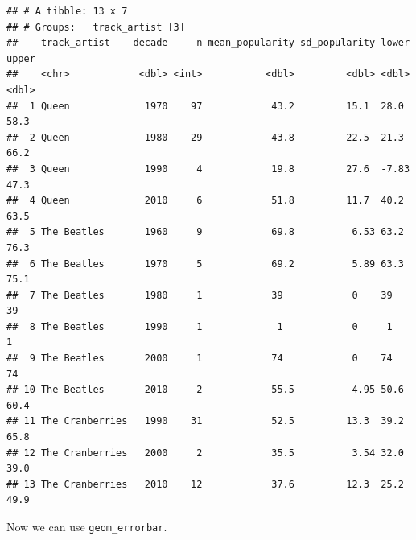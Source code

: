 \documentclass[
]{book}
\newenvironment{Shaded}{\begin{snugshade}}{\end{snugshade}}
\newcommand{\DataTypeTok}[1]{\textcolor[rgb]{0.13,0.29,0.53}{#1}}
\newcommand{\DecValTok}[1]{\textcolor[rgb]{0.00,0.00,0.81}{#1}}
\newcommand{\KeywordTok}[1]{\textcolor[rgb]{0.13,0.29,0.53}{\textbf{#1}}}
\newcommand{\NormalTok}[1]{#1}
\newcommand{\OperatorTok}[1]{\textcolor[rgb]{0.81,0.36,0.00}{\textbf{#1}}}
\newcommand{\StringTok}[1]{\textcolor[rgb]{0.31,0.60,0.02}{#1}}
\begin{document}
\begin{verbatim}
## # A tibble: 13 x 7
## # Groups:   track_artist [3]
##    track_artist    decade     n mean_popularity sd_popularity lower upper
##    <chr>            <dbl> <int>           <dbl>         <dbl> <dbl> <dbl>
##  1 Queen             1970    97            43.2         15.1  28.0   58.3
##  2 Queen             1980    29            43.8         22.5  21.3   66.2
##  3 Queen             1990     4            19.8         27.6  -7.83  47.3
##  4 Queen             2010     6            51.8         11.7  40.2   63.5
##  5 The Beatles       1960     9            69.8          6.53 63.2   76.3
##  6 The Beatles       1970     5            69.2          5.89 63.3   75.1
##  7 The Beatles       1980     1            39            0    39     39  
##  8 The Beatles       1990     1             1            0     1      1  
##  9 The Beatles       2000     1            74            0    74     74  
## 10 The Beatles       2010     2            55.5          4.95 50.6   60.4
## 11 The Cranberries   1990    31            52.5         13.3  39.2   65.8
## 12 The Cranberries   2000     2            35.5          3.54 32.0   39.0
## 13 The Cranberries   2010    12            37.6         12.3  25.2   49.9
\end{verbatim}

Now we can use \texttt{geom\_errorbar}.

\begin{Shaded}
\end{Shaded}
\end{document}
